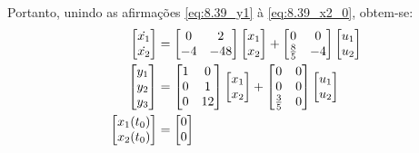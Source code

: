 \documentclass{report}
\begin{document}
Portanto, unindo as afirmações \ref{eq:8.39_y1} à \ref{eq:8.39_x2_0}, obtem-se:
\begin{equation}
      \label{eq:8.39_sol}
      \centering
      \begin{split}
            \begin{bmatrix} \dot{x_1} \\ \dot{x_2} \end{bmatrix} &= \begin{bmatrix} 0 & 2 \\ -4 & -48 \end{bmatrix}
            \begin{bmatrix} x_1 \\ x_2 \end{bmatrix} + \begin{bmatrix} 0 & 0 \\ \frac{8}{5} & -4 \end{bmatrix} \begin{bmatrix} u_1 \\ u_2 \end{bmatrix} \\
            \begin{bmatrix} y_1 \\ y_2 \\ y_3 \end{bmatrix} &= \begin{bmatrix} 1 & 0 \\ 0 & 1 \\ 0 & 12 \end{bmatrix}
            \begin{bmatrix} x_1 \\ x_2 \end{bmatrix} + \begin{bmatrix} 0 & 0 \\ 0 & 0 \\ \frac{3}{5} & 0 \end{bmatrix} \begin{bmatrix} u_1 \\ u_2 \end{bmatrix} \\
          \begin{bmatrix} x_1(t_0) \\ x_2(t_0) \end{bmatrix} &= \begin{bmatrix} 0 \\ 0 \end{bmatrix}
      \end{split}
\end{equation}
\end{document}
